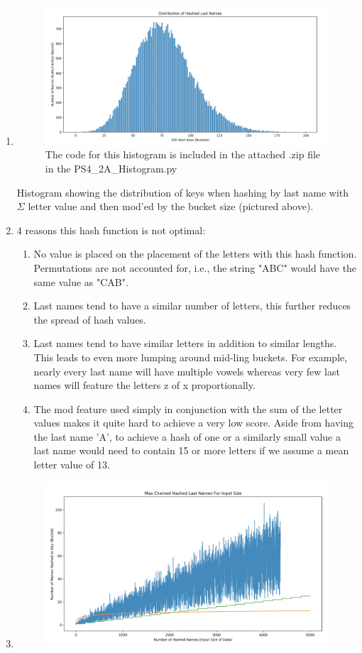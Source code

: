 \documentclass[12pt]{article}
\begin{document}
\begin{enumerate}
\begin{enumerate}
\item
\begin{figure}
    \centering
    \includegraphics[width=0.8\linewidth]{histogram_PS4.jpeg}
    \caption{The code for this histogram is included in the attached .zip file in the PS4\_2A\_Histogram.py}
    \end{figure}
Histogram showing the distribution of keys when hashing by last name with $\Sigma$ letter value and then mod'ed by the bucket size (pictured above).
\item
4 reasons this hash function is not optimal:
\begin{enumerate}
\item No value is placed on the placement of the letters with this hash function. Permutations are not accounted for, i.e., the string "ABC" would have the same value as "CAB".
\item Last names tend to have a similar number of letters, this further reduces the spread of hash values.
\item Last names tend to have similar letters in addition to similar lengths. This leads to even more lumping around mid-ling buckets. For example, nearly every last name will have multiple vowels whereas very few last names will feature the letters z of x proportionally.
\item The mod feature used simply in conjunction with the sum of the letter values makes it quite hard to achieve a very low score. Aside from having the last name 'A', to achieve a hash of one or a similarly small value a last name would need to contain 15 or more letters if we assume a mean letter value of 13.
\end{enumerate}
\newpage
\item
\begin{figure}
    \centering
    \includegraphics[width=0.9\linewidth]{plot.jpeg}

\end{figure}
\end{enumerate}
\end{enumerate}
\end{document}

